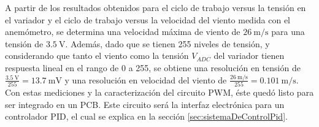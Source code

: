 
A partir de los resultados obtenidos para el ciclo de trabajo versus la tensión en el variador y el ciclo de trabajo versus la velocidad del viento medida con el anemómetro, se determina una velocidad máxima de viento de $\SI{26}{\meter\per\second}$ para una tensión de $\SI{3.5}{\volt}$. Además, dado que se tienen 255 niveles de tensión, y considerando que tanto el viento como la tensión $V_{ADC}$ del variador tienen respuesta lineal en el rango de 0 a 255, se obtiene una resolución en tensión de $\frac{\SI{3.5}{\volt}}{255} = \SI{13.7}{\milli\volt}$ y una resolución en velocidad del viento de $\frac{\SI{26}{\meter\per\second}}{255} = \SI{0.101}{\meter\per\second}$. Con estas mediciones y la caracterización del circuito PWM, éste quedó listo para ser integrado en un PCB. Este circuito será la interfaz electrónica para un controlador PID, el cual se explica en la sección \ref{sec:sistemaDeControlPid}.


